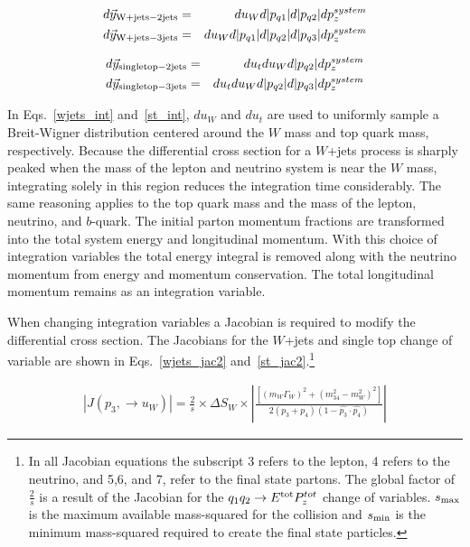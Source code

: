 \begin{itemize}
\begin{eqnarray}
\label{wjets_int}
\nonumber
d\vec{y}_{\rm{W+jets - 2jets}} &=& du_{W}d|p_{q1}|d|p_{q2}|dp^{system}_{z}	\\
d\vec{y}_{\rm{W+jets - 3jets}} &=& du_{W}d|p_{q1}|d|p_{q2}|d|p_{q3}|dp^{system}_{z}
\end{eqnarray}

\begin{eqnarray}
\label{st_int}
\nonumber
d\vec{y}_{\rm{single top - 2jets}} &=& du_{t}du_{W}d|p_{q2}|dp^{system}_{z}	\\
d\vec{y}_{\rm{single top - 3jets}} &=& du_{t}du_{W}d|p_{q2}|d|p_{q3}|dp^{system}_{z}
\end{eqnarray}


In Eqs.~\ref{wjets_int} and~\ref{st_int}, $du_{W}$ and $du_{t}$ are used to uniformly sample a Breit-Wigner distribution centered around the $W$ mass and top quark mass, respectively. Because the differential cross section for a $W$+jets process is sharply peaked when the mass of the lepton and neutrino system is near the $W$ mass, integrating solely in this region reduces the integration time considerably. The same reasoning applies to the top quark mass and the mass of the lepton, neutrino, and $b$-quark. The initial parton momentum fractions are transformed into the total system energy and longitudinal momentum. With this choice of integration variables the total energy integral is removed along with the neutrino momentum from energy and momentum conservation. The total longitudinal momentum remains as an integration variable.

When changing integration variables a Jacobian is required to modify the differential cross section. The Jacobians for the $W$+jets and single top change of variable are shown in Eqs.~\ref{wjets_jac2} and~\ref{st_jac2}.\footnote{In all Jacobian equations the subscript 3 refers to the lepton, 4 refers to the neutrino, and 5,6, and 7, refer to the final state partons. The global factor of $\frac{2}{s}$ is a result of the Jacobian for the $q_{1}q_{2} \rightarrow E^{\rm{tot}}P^{tot}_{z}$ change of variables. $s_{\rm{max}}$ is the maximum available mass-squared for the collision and $s_{\rm{min}}$ is the minimum mass-squared required to create the final state particles.}


\begin{eqnarray}
\label{wjets_jac2}
|J(p_{3}, \rightarrow u_{W})| =
\frac{2}{s} \times \Delta S_{W} \times \left| \frac{\left[
(m_{W}\Gamma_{W})^{2} + (m^{2}_{34} - m_{W}^{2})^{2} \right]}{2(p_{3} + p_{4})(1 -
\hat{p_{3}} \cdot \hat{p_{4}})} \right|
\end{eqnarray}


\end{itemize}
